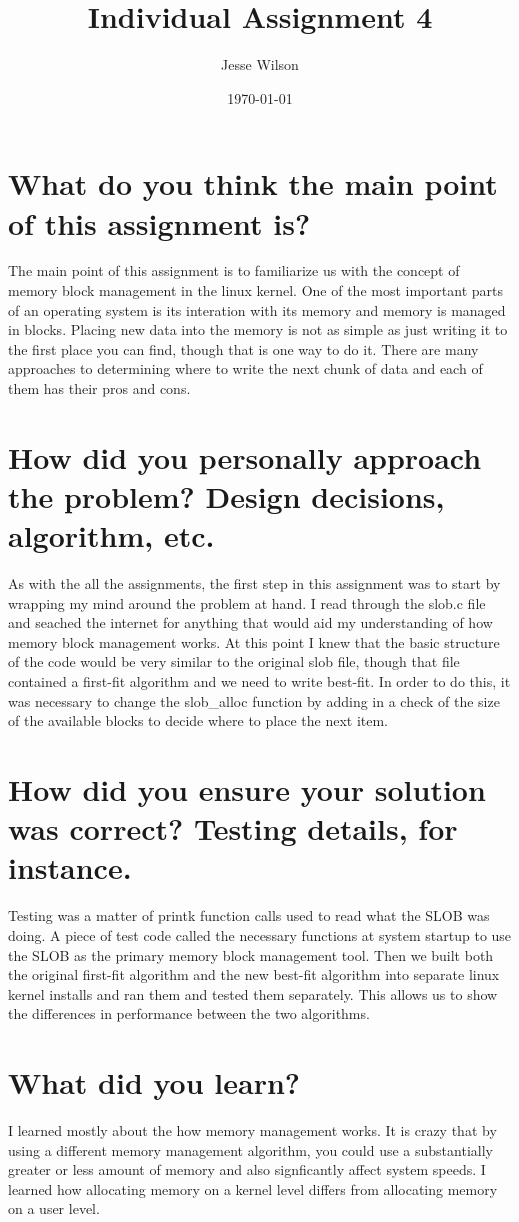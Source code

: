 \documentclass[a4paper]{article}
\title{Individual Assignment 4}
\author{Jesse Wilson}
\date{\today}
\begin{document}
\maketitle

\section{What do you think the main point of this assignment is?}

The main point of this assignment is to familiarize us with the concept of memory block management in the linux kernel. One of the most important parts of an operating system is its interation with its memory and memory is managed in blocks. Placing new data into the memory is not as simple as just writing it to the first place you can find, though that is one way to do it. There are many approaches to determining where to write the next chunk of data and each of them has their pros and cons.


\section{How did you personally approach the problem? Design decisions, algorithm, etc.}

As with the all the assignments, the first step in this assignment was to start by wrapping my mind around the problem at hand. I read through the slob.c file and seached the internet for anything that would aid my understanding of how memory block management works. At this point I knew that the basic structure of the code would be very similar to the original slob file, though that file contained a first-fit algorithm and we need to write best-fit. In order to do this, it was necessary to change the slob_alloc function by adding in a check of the size of the available blocks to decide where to place the next item.


\section{How did you ensure your solution was correct? Testing details, for instance.}

Testing was a matter of printk function calls used to read what the SLOB was doing. A piece of test code called the necessary functions at system startup to use the SLOB as the primary memory block management tool. Then we built both the original first-fit algorithm and the new best-fit algorithm into separate linux kernel installs and ran them and tested them separately. This allows us to show the differences in performance between the two algorithms.


\section{What did you learn?}

I learned mostly about the how memory management works. It is crazy that by using a different memory management algorithm, you could use a substantially greater or less amount of memory and also signficantly affect system speeds. I learned how allocating memory on a kernel level differs from allocating memory on a user level. 
\end{document}
